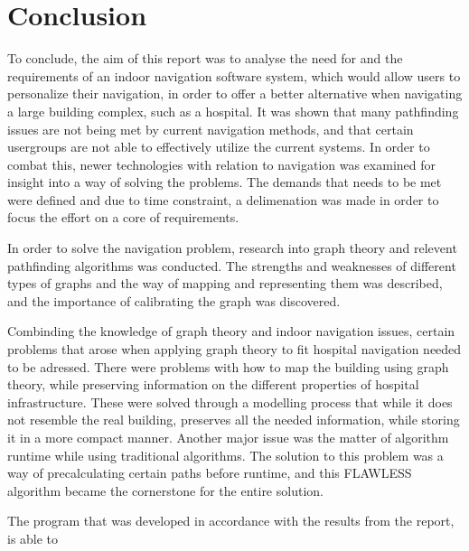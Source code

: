 \chapter{Conclusion}

To conclude, the aim of this report was to analyse the need for and the requirements of an indoor navigation software system, which would allow users to personalize their navigation, in order to offer a better alternative when navigating a large building complex, such as a hospital. It was shown that many pathfinding issues are not being met by current navigation methods, and that certain usergroups are not able to effectively utilize the current systems. In order to combat this, newer technologies with relation to navigation was examined for insight into a way of solving the problems. The demands that needs to be met were defined and due to time constraint, a delimenation was made in order to focus the effort on a core of requirements.

In order to solve the navigation problem, research into graph theory and relevent pathfinding algorithms was conducted. The strengths and weaknesses of different types of graphs and the way of mapping and representing them was described, and the importance of calibrating the graph was discovered. 

Combinding the knowledge of graph theory and indoor navigation issues, certain problems that arose when applying graph theory to fit hospital navigation needed to be adressed. There were problems with how to map the building using graph theory, while preserving information on the different properties of hospital infrastructure. These were solved through a modelling process that while it does not resemble the real building, preserves all the needed information, while storing it in a more compact manner. Another major issue was the matter of algorithm runtime while using traditional algorithms. The solution to this problem was a way of precalculating certain paths before runtime, and this FLAWLESS algorithm became the cornerstone for the entire solution.

The program that was developed in accordance with the results from the report, is able to 

